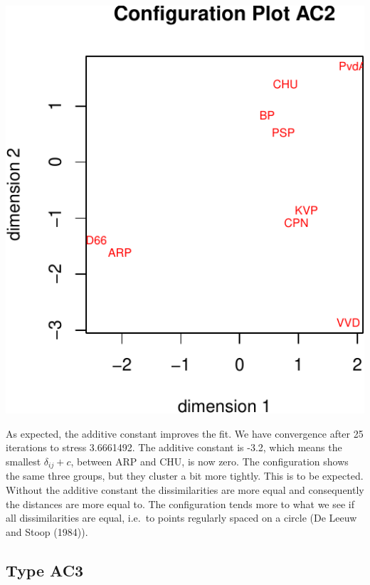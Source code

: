 \documentclass[
  12pt,
]{article}
\begin{document}
\begin{center}\includegraphics{smacofAC_files/figure-latex/gruijterh10-2} \end{center}

As expected, the additive constant improves the fit. We have convergence after 25
iterations to stress 3.6661492. The additive constant is -3.2, which means the smallest \(\delta_{ij}+c\), between ARP and CHU, is now zero. The configuration shows the same three groups, but they cluster a bit more tightly. This is to be expected. Without the
additive constant the dissimilarities are more equal and consequently the distances are
more equal to. The configuration tends more to what we see if all dissimilarities are equal,
i.e.~to points regularly spaced on a circle (De Leeuw and Stoop (1984)).

\subsection{Type AC3}\label{type-ac3-1}
\end{document}
